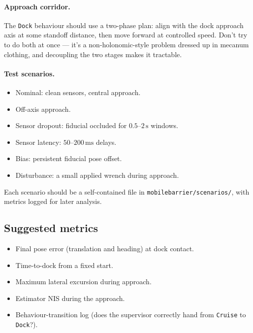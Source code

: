 \documentclass[11pt,a4paper]{article}
\newcommand{\code}[1]{\texttt{\small #1}}
\newcommand{\file}[1]{\texttt{\small #1}}
\begin{document}
\paragraph{Approach corridor.} The \code{Dock} behaviour should use a
two-phase plan: align with the dock approach axis at some standoff
distance, then move forward at controlled speed. Don't try to do both at
once --- it's a non-holonomic-style problem dressed up in mecanum
clothing, and decoupling the two stages makes it tractable.

\paragraph{Test scenarios.}
\begin{itemize}
    \item Nominal: clean sensors, central approach.
    \item Off-axis approach.
    \item Sensor dropout: fiducial occluded for $0.5$--$2\,\text{s}$
        windows.
    \item Sensor latency: $50$--$200\,\text{ms}$ delays.
    \item Bias: persistent fiducial pose offset.
    \item Disturbance: a small applied wrench during approach.
\end{itemize}

Each scenario should be a self-contained file in
\file{mobilebarrier/scenarios/}, with metrics logged for later analysis.

\subsection*{Suggested metrics}

\begin{itemize}
    \item Final pose error (translation and heading) at dock contact.
    \item Time-to-dock from a fixed start.
    \item Maximum lateral excursion during approach.
    \item Estimator NIS during the approach.
    \item Behaviour-transition log (does the supervisor correctly hand
        from \code{Cruise} to \code{Dock}?).
\end{itemize}

\end{document}
